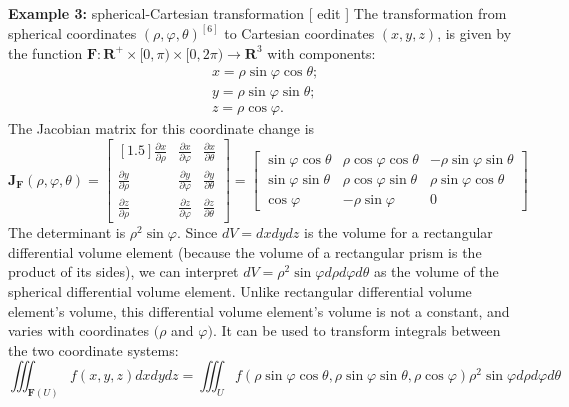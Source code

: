 \documentclass[14pt]{article}
\theoremstyle{definition}
\theoremstyle{remark}
\begin{document}
\textbf{Example 3:} spherical-Cartesian transformation [ edit ]
The transformation from spherical coordinates $(\rho, \varphi, \theta)^{[6]}$ to Cartesian coordinates $(x, y, z)$, is given by the function $\mathbf{F}: \mathbf{R}^{+} \times[0, \pi) \times[0,2 \pi) \rightarrow \mathbf{R}^3$ with components:
$$
    \begin{aligned}
         & x=\rho \sin \varphi \cos \theta ; \\
         & y=\rho \sin \varphi \sin \theta ; \\
         & z=\rho \cos \varphi .
    \end{aligned}
$$
The Jacobian matrix for this coordinate change is
$$
    \mathbf{J}_{\mathbf{F}}(\rho, \varphi, \theta)=\begin{bmatrix}[1.5]
        \frac{\partial x}{\partial \rho} & \frac{\partial x}{\partial \varphi} & \frac{\partial x}{\partial \theta} \\
        \frac{\partial y}{\partial \rho} & \frac{\partial y}{\partial \varphi} & \frac{\partial y}{\partial \theta} \\
        \frac{\partial z}{\partial \rho} & \frac{\partial z}{\partial \varphi} & \frac{\partial z}{\partial \theta}
    \end{bmatrix}=\left[\begin{array}{ccc}
            \sin \varphi \cos \theta & \rho \cos \varphi \cos \theta & -\rho \sin \varphi \sin \theta \\
            \sin \varphi \sin \theta & \rho \cos \varphi \sin \theta & \rho \sin \varphi \cos \theta  \\
            \cos \varphi             & -\rho \sin \varphi            & 0
        \end{array}\right]
$$
The determinant is $\rho^2 \sin \varphi$. Since $d V=d x d y d z$ is the volume for a rectangular differential volume element (because the volume of a rectangular prism is the product of its sides), we can interpret $d V=\rho^2 \sin \varphi d \rho d \varphi d \theta$ as the volume of the spherical differential volume element. Unlike rectangular differential volume element's volume, this differential volume element's volume is not a constant, and varies with coordinates $(\rho$ and $\varphi)$. It can be used to transform integrals between the two coordinate systems:
$$
    \iiint_{\mathbf{F}(U)} f(x, y, z) d x d y d z=\iiint_U f(\rho \sin \varphi \cos \theta, \rho \sin \varphi \sin \theta, \rho \cos \varphi) \rho^2 \sin \varphi d \rho d \varphi d \theta
$$
\end{document}
